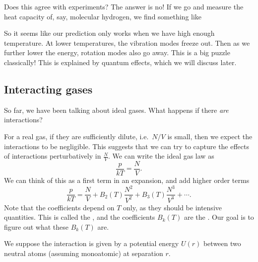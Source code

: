 \documentclass[a4paper]{article}
\begin{document}
Does this agree with experiments? The answer is no! If we go and measure the heat capacity of, say, molecular hydrogen, we find something like
\begin{center}
\end{center}
So it seems like our prediction only works when we have high enough temperature. At lower temperatures, the vibration modes freeze out. Then as we further lower the energy, rotation modes also go away. This is a big puzzle classically! This is explained by quantum effects, which we will discuss later.

\subsection{Interacting gases}
So far, we have been talking about ideal gases. What happens if there \emph{are} interactions?

For a real gas, if they are sufficiently dilute, i.e.\ $N/V$ is small, then we expect the interactions to be negligible. This suggests that we can try to capture the effects of interactions perturbatively in $\frac{N}{V}$. We can write the ideal gas law as
\[
  \frac{p}{kT} = \frac{N}{V}.
\]
We can think of this as a first term in an expansion, and add higher order terms
\[
  \frac{p}{kT} = \frac{N}{V} + B_2(T) \frac{N^2}{V^2} + B_3 (T) \frac{N^3}{V^3} + \cdots.
\]
Note that the coefficients depend on $T$ only, as they should be intensive quantities. This is called the , and the coefficients $B_k(T)$ are the . Our goal is to figure out what these $B_k(T)$ are.

We suppose the interaction is given by a potential energy $U(r)$ between two neutral atoms (assuming monoatomic) at separation $r$.
\end{document}
